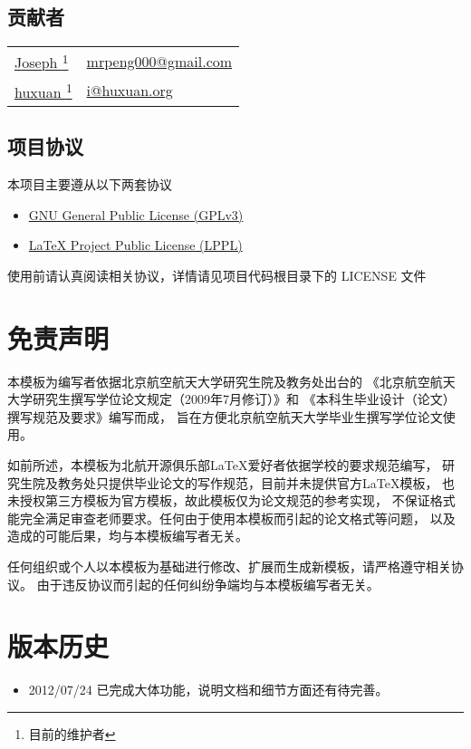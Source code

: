 \subsection{贡献者}
\begin{tabularx}{\textwidth}{@{\hspace{2em}}ll}
    \href{https://github.com/JosephPeng/}{Joseph \footnote{目前的维护者}} &
    \href{mailto:mrpeng000@gmail.com}{mrpeng000@gmail.com} \\
    \href{http://huxuan.org/}{huxuan \textsuperscript{1}} &
    \href{mailto:i@huxuan.org}{i@huxuan.org} \\
\end{tabularx}

\subsection{项目协议}
本项目主要遵从以下两套协议
\begin{itemize}
    \item \href{http://www.gnu.org/licenses/gpl.txt}
        {GNU General Public License (GPLv3)}
    \item \href{http://www.latex-project.org/lppl.txt}
        {\LaTeX{} Project Public License (LPPL)}
\end{itemize}
使用前请认真阅读相关协议，详情请见项目代码根目录下的 LICENSE 文件

\section{免责声明}
本模板为编写者依据北京航空航天大学研究生院及教务处出台的
《北京航空航天大学研究生撰写学位论文规定（2009年7月修订）》和
《本科生毕业设计（论文）撰写规范及要求》编写而成，
旨在方便北京航空航天大学毕业生撰写学位论文使用。

如前所述，本模板为北航开源俱乐部\LaTeX{}爱好者依据学校的要求规范编写，
研究生院及教务处只提供毕业论文的写作规范，目前并未提供官方\LaTeX{}模板，
也未授权第三方模板为官方模板，故此模板仅为论文规范的参考实现，
不保证格式能完全满足审查老师要求。任何由于使用本模板而引起的论文格式等问题，
以及造成的可能后果，均与本模板编写者无关。

任何组织或个人以本模板为基础进行修改、扩展而生成新模板，请严格遵守相关协议。
由于违反协议而引起的任何纠纷争端均与本模板编写者无关。

\section{版本历史}
\begin{itemize}
    \item[1.0] 2012/07/24 已完成大体功能，说明文档和细节方面还有待完善。
\end{itemize}
